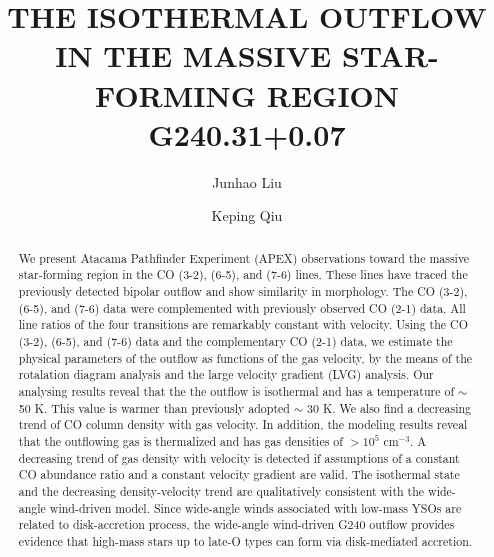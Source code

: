 \documentclass[twocolumn]{aastex62}
\begin{document}
\title{THE ISOTHERMAL OUTFLOW IN THE MASSIVE STAR-FORMING REGION G240.31+0.07}




\author{Junhao Liu}

\author{Keping Qiu}

\begin{abstract}
We present Atacama Pathfinder Experiment (APEX) observations toward the massive star-forming region  in the CO (3-2), (6-5), and (7-6) lines. These lines have traced the previously detected bipolar outflow and show similarity in morphology. The CO (3-2), (6-5), and (7-6) data were complemented with previously observed CO (2-1) data. All line ratios of the four transitions are remarkably constant with velocity. Using the CO (3-2), (6-5), and (7-6) data and the complementary CO (2-1) data, we estimate the physical parameters of the outflow as functions of the gas velocity, by the means of the rotalation diagram analysis and the large velocity gradient (LVG) analysis. Our analysing results reveal that the the outflow is isothermal and has a temperature of $\sim$ 50 K. This value is warmer than previously adopted $\sim$ 30 K. We also find a decreasing trend of CO column density with gas velocity. In addition, the modeling results reveal that the outflowing gas is thermalized and has gas densities of $ > 10^5$ cm$^{-3}$. A decreasing trend of gas density with velocity is detected if assumptions of a constant CO abundance ratio and a constant velocity gradient are valid. The isothermal state and the decreasing density-velocity trend are qualitatively consistent with the wide-angle wind-driven model. Since wide-angle winds associated with low-mass YSOs are related to disk-accretion process, the wide-angle wind-driven G240 outflow provides evidence that high-mass stars up to late-O types can form via disk-mediated accretion.
\end{abstract}








\end{document}
